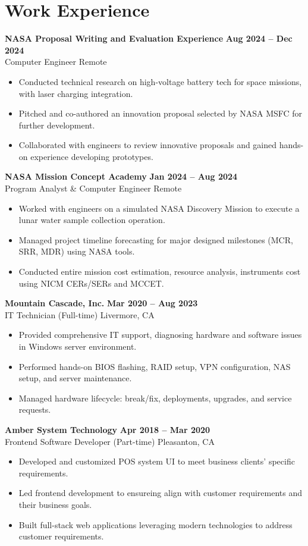 \documentclass[letterpaper,11pt]{article}
\begin{document}
\section*{Work Experience}
\textbf{NASA Proposal Writing and Evaluation Experience} \hfill \textbf{Aug 2024 -- Dec 2024} \\
Computer Engineer  \hfill Remote
\begin{itemize}
    \item Conducted technical research on high-voltage battery tech for space missions, with laser charging integration.
    \item Pitched and co-authored an innovation proposal selected by NASA MSFC for further development.
    \item Collaborated with engineers to review innovative proposals and gained hands-on experience developing prototypes.
\end{itemize}
\vspace{4mm}
\textbf{NASA Mission Concept Academy} \hfill \textbf{Jan 2024 -- Aug 2024} \\
Program Analyst \& Computer Engineer \hfill Remote
\begin{itemize}
    \item Worked with engineers on a simulated NASA Discovery Mission to execute a lunar water sample collection operation.
    \item Managed project timeline forecasting for major designed milestones (MCR, SRR, MDR) using NASA tools.
    \item Conducted entire mission cost estimation, resource analysis, instruments cost using NICM CERs/SERs and MCCET.
\end{itemize}
\vspace{4mm}
\textbf{Mountain Cascade, Inc.} \hfill \textbf{Mar 2020 -- Aug 2023} \\
IT Technician (Full-time) \hfill Livermore, CA
\begin{itemize}
    \item Provided comprehensive IT support, diagnosing hardware and software issues in Windows server environment.
    \item Performed hands-on BIOS flashing, RAID setup, VPN configuration, NAS setup, and server maintenance.
    \item Managed hardware lifecycle: break/fix, deployments, upgrades, and service requests.
\end{itemize}
\vspace{4mm}
\textbf{Amber System Technology} \hfill \textbf{Apr 2018 -- Mar 2020} \\
Frontend Software Developer (Part-time) \hfill Pleasanton, CA
\begin{itemize}
    \item Developed and customized POS system UI to meet business clients’ specific requirements.
    \item Led frontend development to ensureing align with customer requirements and their business goals.
    \item Built full-stack web applications leveraging modern technologies to address customer requirements.
\end{itemize}
\end{document}
